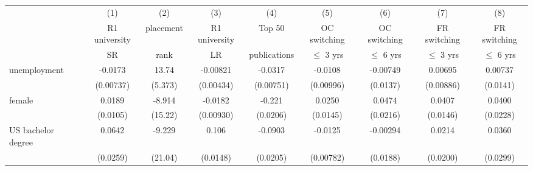 \begin{table}[htbp]\centering
	\label{tb:table11}
	\begin{adjustbox}{max width=1\textwidth}
\begin{tabular}{l*{8}{c}}
\hline\hline
            &\multicolumn{1}{c}{(1)}&\multicolumn{1}{c}{(2)}&\multicolumn{1}{c}{(3)}&\multicolumn{1}{c}{(4)}&\multicolumn{1}{c}{(5)}&\multicolumn{1}{c}{(6)}&\multicolumn{1}{c}{(7)}&\multicolumn{1}{c}{(8)}\\
            &\multicolumn{1}{c}{R1 university}&\multicolumn{1}{c}{placement}&\multicolumn{1}{c}{R1 university}&\multicolumn{1}{c}{Top 50}&\multicolumn{1}{c}{OC switching}&\multicolumn{1}{c}{OC switching}&\multicolumn{1}{c}{FR switching}&\multicolumn{1}{c}{FR switching}\\
            &\multicolumn{1}{c}{SR}&\multicolumn{1}{c}{rank}&\multicolumn{1}{c}{LR}&\multicolumn{1}{c}{publications}&\multicolumn{1}{c}{$\le$ 3 yrs}&\multicolumn{1}{c}{$\le$ 6 yrs}&\multicolumn{1}{c}{$\le$ 3 yrs}&\multicolumn{1}{c}{$\le$ 6 yrs}\\
\hline
unemployment    &     -0.0173\sym{**} &       13.74\sym{**} &    -0.00821\sym{*}  &     -0.0317\sym{***}&     -0.0108         &    -0.00749         &     0.00695         &     0.00737         \\
            &   (0.00737)         &     (5.373)         &   (0.00434)         &   (0.00751)         &   (0.00996)         &    (0.0137)         &   (0.00886)         &    (0.0141)         \\
[1em]
female &      0.0189         &      -8.914         &     -0.0182\sym{*}  &      -0.221\sym{***}&      0.0250         &      0.0474\sym{*}  &      0.0407\sym{**} &      0.0400         \\
            &    (0.0105)         &     (15.22)         &   (0.00930)         &    (0.0206)         &    (0.0145)         &    (0.0216)         &    (0.0146)         &    (0.0228)         \\
[1em]
US bachelor degree   &      0.0642\sym{**} &      -9.229         &       0.106\sym{***}&     -0.0903\sym{***}&     -0.0125         &    -0.00294         &      0.0214         &      0.0360         \\
            &    (0.0259)         &     (21.04)         &    (0.0148)         &    (0.0205)         &   (0.00782)         &    (0.0188)         &    (0.0200)         &    (0.0299)         \\

\end{tabular}
\end{adjustbox}
\end{table}
